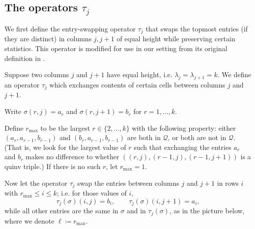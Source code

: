 \documentclass[11pt]{article}
\theoremstyle{definition}
\numberwithin{equation}{section}
\newcommand{\cQ}{\mathcal{Q}}
\begin{document}
\subsection{The operators $\tau_j$}

We first define the entry-swapping operator $\tau_j$ that swaps the topmost entries (if they are distinct) in columns $j,j+1$ of equal height while preserving certain statistics. This operator is modified for use in our setting from its original definition in \cite{LoehrNiese}.

\begin{defn}\label{def:tau}

Suppose two columns $j$ and $j+1$ have equal height, i.e.
$\lambda_j=\lambda_{j+1}=k$. We define an operator $\tau_j$ which
exchanges contents of certain cells between columns $j$ and $j+1$. 

Write $\sigma(r,j)=a_r$ and $\sigma(r,j+1)=b_r$ for $r=1,\dots, k$. 

Define $r_{\max}$ to be the largest $r\in\{2,\dots,k\}$ with the following property:
either $(a_r, a_{r-1}, b_{r-1})$ and $(b_r, a_{r-1}, b_{r-1})$ are both in $\cQ$,
or both are not in $\cQ$. \textup{(}That is, we look for the largest value of $r$ 
such that exchanging the entries $a_r$ and $b_r$
makes no difference to whether $((r,j), (r-1,j), (r-1, j+1))$ is a quinv triple.\textup{)}
If there is no such $r$, let $r_{\max}=1$. 

Now let the operator $\tau_j$ swap the entries between columns $j$ and $j+1$
in rows $i$ with $r_{\max}\leq i\leq k$; i.e. for those values of $i$,
\[
\tau_j(\sigma)(i,j)=b_i,
\qquad 
\tau_j(\sigma)(i,j+1)=a_i,
\]
while all other entries are the same in $\sigma$ and in $\tau_j(\sigma)$,
as in the picture below, where we denote $\ell\coloneqq r_{\max}$.



\end{defn}
\end{document}
